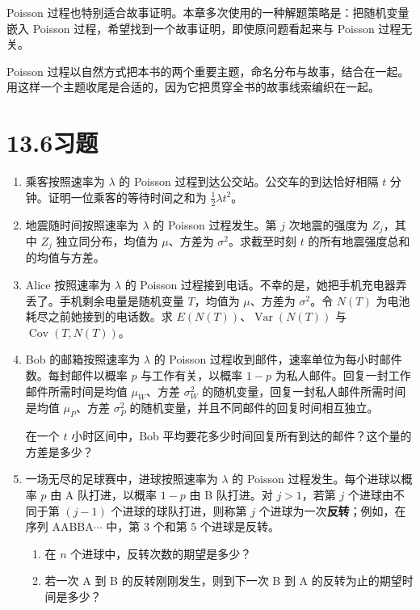 \documentclass[UTF8, 12pt, fontset=fandol, oneside]{ctexart}
\begin{document}
Poisson 过程也特别适合故事证明。本章多次使用的一种解题策略是：把随机变量嵌入 Poisson 过程，希望找到一个故事证明，即使原问题看起来与 Poisson 过程无关。

Poisson 过程以自然方式把本书的两个重要主题，命名分布与故事，结合在一起。用这样一个主题收尾是合适的，因为它把贯穿全书的故事线索编织在一起。

\section*{13.6\quad 习题}

\begin{enumerate}
  \item 乘客按照速率为 $\lambda$ 的 Poisson 过程到达公交站。公交车的到达恰好相隔 $t$ 分钟。证明一位乘客的等待时间之和为 $\frac12\lambda t^2$。

  \item 地震随时间按照速率为 $\lambda$ 的 Poisson 过程发生。第 $j$ 次地震的强度为 $Z_j$，其中 $Z_j$ 独立同分布，均值为 $\mu$、方差为 $\sigma^2$。求截至时刻 $t$ 的所有地震强度总和的均值与方差。

  \item Alice 按照速率为 $\lambda$ 的 Poisson 过程接到电话。不幸的是，她把手机充电器弄丢了。手机剩余电量是随机变量 $T$，均值为 $\mu$、方差为 $\sigma^2$。令 $N(T)$ 为电池耗尽之前她接到的电话数。求 $E(N(T))$、$\operatorname{Var}(N(T))$ 与 $\operatorname{Cov}(T,N(T))$。

  \item Bob 的邮箱按照速率为 $\lambda$ 的 Poisson 过程收到邮件，速率单位为每小时邮件数。每封邮件以概率 $p$ 与工作有关，以概率 $1-p$ 为私人邮件。回复一封工作邮件所需时间是均值 $\mu_W$、方差 $\sigma_W^2$ 的随机变量，回复一封私人邮件所需时间是均值 $\mu_P$、方差 $\sigma_P^2$ 的随机变量，并且不同邮件的回复时间相互独立。

  在一个 $t$ 小时区间中，Bob 平均要花多少时间回复所有到达的邮件？这个量的方差是多少？

  \item 一场无尽的足球赛中，进球按照速率为 $\lambda$ 的 Poisson 过程发生。每个进球以概率 $p$ 由 A 队打进，以概率 $1-p$ 由 B 队打进。对 $j>1$，若第 $j$ 个进球由不同于第 $(j-1)$ 个进球的球队打进，则称第 $j$ 个进球为一次\textbf{反转}；例如，在序列 AABBA$\cdots$ 中，第 3 个和第 5 个进球是反转。
  \begin{enumerate}
    \item 在 $n$ 个进球中，反转次数的期望是多少？
    \item 若一次 A 到 B 的反转刚刚发生，则到下一次 B 到 A 的反转为止的期望时间是多少？
  \end{enumerate}


\end{enumerate}
\end{document}
